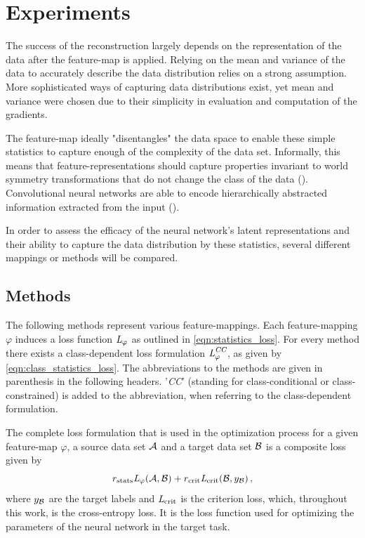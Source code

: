 
\chapter{Experiments}
\label{chap:Experiments} 

The success of the reconstruction largely depends on the representation of the data
after the feature-map is applied.
Relying on the mean and variance of the data to accurately describe the data distribution 
relies on a strong assumption.
More sophisticated ways of capturing data distributions exist, yet mean and variance were chosen due to their simplicity in evaluation and computation of the gradients.

The feature-map ideally "disentangles" the data space to enable 
these simple statistics to capture enough of the complexity of the data set.
Informally, this means that feature-representations
should capture properties invariant to world symmetry transformations that
do not change the class of the data (\cite{Disentangling_Def}).
Convolutional neural networks are able to encode hierarchically abstracted 
information extracted from the input (\cite{olah2017feature}).

In order to assess the efficacy of the neural network's latent representations 
and their ability to capture the data distribution by these statistics,
several different mappings or methods will be compared. 


\section{Methods}
\label{sec:methods}

The following methods represent various feature-mappings.
Each feature-mapping $\varphi$ induces a loss function $\textit{L}_\varphi$ as outlined in \cref{eqn:statistics_loss}.
For every method there exists a class-dependent loss formulation $\textit{L}^\textit{CC}_\varphi$,
as given by \cref{eqn:class_statistics_loss}.
The abbreviations to the methods are given in parenthesis in the following headers. 
'\textit{CC}' (standing for class-conditional or class-constrained) is added to the abbreviation,
when referring to the class-dependent formulation.

The complete loss formulation that is used in the optimization process 
for a given feature-map $\varphi$, a source data set $\mathcal A$ and a target data set $\mathcal B$ 
is a composite loss given by
\[
    r_\text{stats}\textit{L}_\varphi(\mathcal A, \mathcal B) + r_\text{crit}\textit{L}_\text{crit}(\mathcal B, y_{\mathcal B}) \,,
\]
where $y_{\mathcal B}$ are the target labels and $\textit{L}_\text{crit}$ is the criterion loss, 
which, throughout this work, is the cross-entropy loss.
It is the loss function used for optimizing the parameters of the neural network
in the target task.




